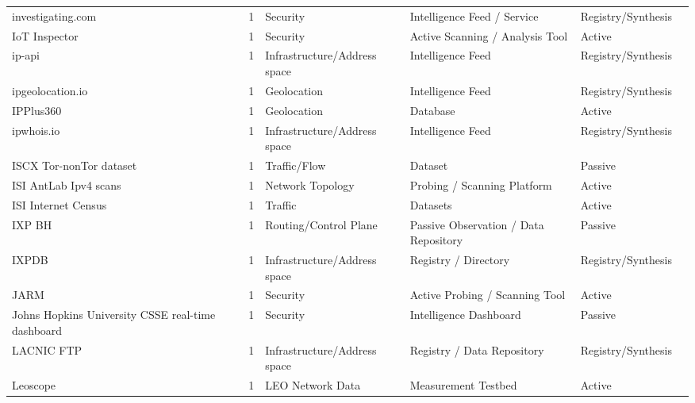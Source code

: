 \documentclass[11pt,a4paper]{article}
\begin{document}
\begin{longtable}{@{}p{}p{}p{}p{}p{}p{}p{}@{}}
investigating.com & \cite{investigating_com} & 1 & Security & Intelligence Feed / Service & Registry/Synthesis & \cite{10.1007/978-3-031-56252-5_3} \\
IoT Inspector & \cite{iot_inspector} & 1 & Security & Active Scanning / Analysis Tool & Active & \cite{10.1145/3618257.3624815} \\
ip-api & \cite{ip_api} & 1 & Infrastructure/Address space & Intelligence Feed & Registry/Synthesis & \cite{10.1007/978-3-030-98785-5_24} \\
ipgeolocation.io & \cite{ipgeolocation} & 1 & Geolocation & Intelligence Feed & Registry/Synthesis & \cite{10.1007/978-3-031-56252-5_11} \\
IPPlus360 & \cite{ipplus} & 1 & Geolocation & Database & Active & \cite{10.1145/3777912.3839813} \\
ipwhois.io & \cite{ipwhois} & 1 & Infrastructure/Address space & Intelligence Feed & Registry/Synthesis & \cite{10.1145/3730567.3764427} \\
ISCX Tor-nonTor dataset & \cite{iscx_tornontor} & 1 & Traffic/Flow & Dataset & Passive & \cite{10.1145/3517745.3561436} \\
ISI AntLab Ipv4 scans & \cite{isi_antlab_ipv4} & 1 & Network Topology & Probing / Scanning Platform & Active & \cite{10.1007/978-3-031-56249-5_8} \\
ISI Internet Census & \cite{10.1145/1452520.1452542} & 1 & Traffic & Datasets & Active & \cite{10.1145/3777912.3839831} \\
IXP BH & \cite{10.1007/978-3-030-72582-2_17} & 1 & Routing/Control Plane & Passive Observation / Data Repository & Passive & \cite{10.1145/3646547.3688451} \\
IXPDB & \cite{iscx_tornontor} & 1 & Infrastructure/Address space & Registry / Directory & Registry/Synthesis & \cite{10.1007/978-3-030-72582-2_14} \\
JARM & \cite{isi_antlab_ipv4} & 1 & Security & Active Probing / Scanning Tool & Active & \cite{10.1007/978-3-031-28486-1_6} \\
Johns Hopkins University CSSE real-time dashboard & \cite{itunes_search_api} & 1 & Security & Intelligence Dashboard & Passive & \cite{10.1145/3487552.3487831} \\
LACNIC FTP & \cite{lacnicftp} & 1 & Infrastructure/Address space & Registry / Data Repository & Registry/Synthesis & \cite{10.1145/3487552.3487838} \\
Leoscope & \cite{leoscope} & 1 & LEO Network Data & Measurement Testbed & Active & \cite{10.1145/3777912.3839805} \\

\end{longtable}
\end{document}
